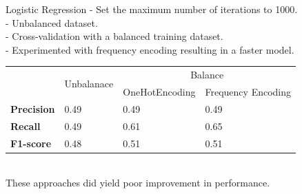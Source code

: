 \documentclass[12pt,aspectratio=169,notheorems]{beamer}
\begin{document}
\begin{frame}{Logistic Regression}
        - Set the maximum number of iterations to 1000. \\
        - Unbalanced dataset. \\
        - Cross-validation with a balanced training dataset. \\
        - Experimented with frequency encoding resulting in a faster model.
        \vspace{0.2cm}
    \begin{table}[]
        \begin{tabular}{l|l|ll|}
        \cline{2-4}
            & \multicolumn{1}{c|}{\multirow{2}{*}{Unbalanace}} & \multicolumn{2}{c|}{Balance}                             \\ \cline{3-4}
            & \multicolumn{1}{c|}{}                            & \multicolumn{1}{l|}{OneHotEncoding} & Frequency Encoding \\ \hline
            \multicolumn{1}{|l|}{\textbf{Precision}} & 0.49                                             & \multicolumn{1}{l|}{0.49}           & 0.49               \\ \hline
            \multicolumn{1}{|l|}{\textbf{Recall}}    & 0.49                                             & \multicolumn{1}{l|}{0.61}           & 0.65               \\ \hline
            \multicolumn{1}{|l|}{\textbf{F1-score}}  & 0.48                                             & \multicolumn{1}{l|}{0.51}           & 0.51               \\ \hline
        \end{tabular}
        \\
        \vspace{0.4cm}
        These approaches did yield poor improvement in performance.
    \end{table}
\end{frame}
\end{document}
